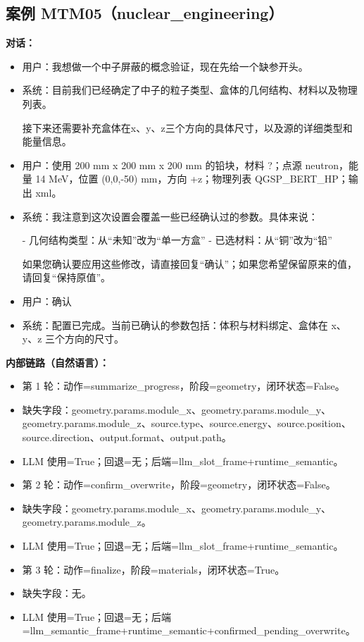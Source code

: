 \documentclass[11pt]{ctexart}
\begin{document}
\subsection{案例 MTM05（nuclear\_engineering）}
\textbf{对话：}
\begin{itemize}
\item 用户：我想做一个中子屏蔽的概念验证，现在先给一个缺参开头。
\item 系统：目前我们已经确定了中子的粒子类型、盒体的几何结构、材料以及物理列表。

接下来还需要补充盒体在x、y、z三个方向的具体尺寸，以及源的详细类型和能量信息。
\item 用户：使用 200 mm x 200 mm x 200 mm 的铅块，材料 ?；点源 neutron，能量 14 MeV，位置 (0,0,-50) mm，方向 +z；物理列表 QGSP\_BERT\_HP；输出 xml。
\item 系统：我注意到这次设置会覆盖一些已经确认过的参数。具体来说：

- 几何结构类型：从“未知”改为“单一方盒”
- 已选材料：从“铜”改为“铅”

如果您确认要应用这些修改，请直接回复“确认”；如果您希望保留原来的值，请回复“保持原值”。
\item 用户：确认
\item 系统：配置已完成。当前已确认的参数包括：体积与材料绑定、盒体在 x、y、z 三个方向的尺寸。
\end{itemize}
\textbf{内部链路（自然语言）：}
\begin{itemize}
\item 第 1 轮：动作=summarize\_progress，阶段=geometry，闭环状态=False。
\item 缺失字段：geometry.params.module\_x、geometry.params.module\_y、geometry.params.module\_z、source.type、source.energy、source.position、source.direction、output.format、output.path。
\item LLM 使用=True；回退=无；后端=llm\_slot\_frame+runtime\_semantic。
\item 第 2 轮：动作=confirm\_overwrite，阶段=geometry，闭环状态=False。
\item 缺失字段：geometry.params.module\_x、geometry.params.module\_y、geometry.params.module\_z。
\item LLM 使用=True；回退=无；后端=llm\_slot\_frame+runtime\_semantic。
\item 第 3 轮：动作=finalize，阶段=materials，闭环状态=True。
\item 缺失字段：无。
\item LLM 使用=True；回退=无；后端=llm\_semantic\_frame+runtime\_semantic+confirmed\_pending\_overwrite。
\end{itemize}
\end{document}
